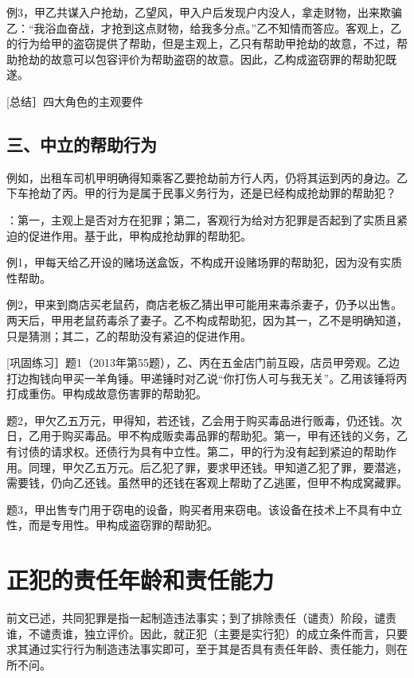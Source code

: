 例3，甲乙共谋入户抢劫，乙望风，甲入户后发现户内没人，拿走财物，出来欺骗乙：“我浴血奋战，才抢到这点财物，给我多分点。”乙不知情而答应。客观上，乙的行为给甲的盗窃提供了帮助，但是主观上，乙只有帮助甲抢劫的故意，不过，帮助抢劫的故意可以包容评价为帮助盗窃的故意。因此，乙构成盗窃罪的帮助犯既遂。

[总结］四大角色的主观要件


\subsection*{三、中立的帮助行为}

例如，出租车司机甲明确得知乘客乙要抢劫前方行人丙，仍将其运到丙的身边。乙下车抢劫了丙。甲的行为是属于民事义务行为，还是已经构成抢劫罪的帮助犯？

：第一，主观上是否对方在犯罪；第二，客观行为给对方犯罪是否起到了实质且紧迫的促进作用。基于此，甲构成抢劫罪的帮助犯。

例1，甲每天给乙开设的赌场送盒饭，不构成开设赌场罪的帮助犯，因为没有实质性帮助。

例2，甲来到商店买老鼠药，商店老板乙猜出甲可能用来毒杀妻子，仍予以出售。两天后，甲用老鼠药毒杀了妻子。乙不构成帮助犯，因为其一，乙不是明确知道，只是猜测；其二，乙的帮助没有紧迫的促进作用。

[巩固练习］题1（2013年第55题），乙、丙在五金店门前互殴，店员甲旁观。乙边打边掏钱向甲买一羊角锤。甲递锤时对乙说“你打伤人可与我无关”。乙用该锤将丙打成重伤。甲构成故意伤害罪的帮助犯。

题2，甲欠乙五万元，甲得知，若还钱，乙会用于购买毒品进行贩毒，仍还钱。次日，乙用于购买毒品。甲不构成贩卖毒品罪的帮助犯。第一，甲有还钱的义务，乙有讨债的请求权。还债行为具有中立性。第二，甲的行为没有起到紧迫的帮助作用。同理，甲欠乙五万元。后乙犯了罪，要求甲还钱。甲知道乙犯了罪，要潜逃，需要钱，仍向乙还钱。虽然甲的还钱在客观上帮助了乙逃匿，但甲不构成窝藏罪。

题3，甲出售专门用于窃电的设备，购买者用来窃电。该设备在技术上不具有中立性，而是专用性。甲构成盗窃罪的帮助犯。

\section{正犯的责任年龄和责任能力}

前文已述，共同犯罪是指一起制造违法事实；到了排除责任（谴责）阶段，谴责谁，不谴责谁，独立评价。因此，就正犯（主要是实行犯）的成立条件而言，只要求其通过实行行为制造违法事实即可，至于其是否具有责任年龄、责任能力，则在所不问。

